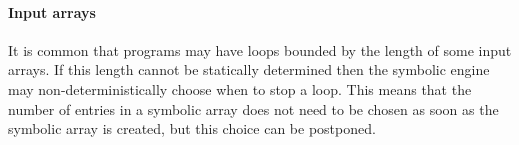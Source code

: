 \paragraph{Input arrays}
It is common that programs may have loops bounded by the length of some input arrays. If this length cannot be statically determined then the symbolic engine may non-deterministically choose when to stop a loop. This means that the number of entries in a symbolic array does not need to be chosen as soon as the symbolic array is created, but this choice can be postponed.



\iffalse

